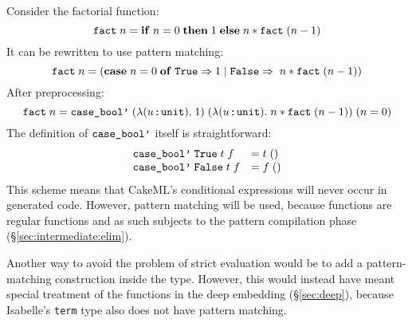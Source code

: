 Consider the factorial function:
%
  \[ \texttt{\textup{fact}}\;n = \mathtt{\mathbf{if}}\;n = 0\;\mathtt{\mathbf{then}}\;1\;\mathtt{\mathbf{else}}\;n * \texttt{\textup{fact}}\;(n - 1) \]
%
It can be rewritten to use pattern matching:
%
  \[ \texttt{\textup{fact}}\;n = (\mathtt{\mathbf{case}}\;n = 0\;\mathtt{\mathbf{of}}\;\texttt{\textup{True}} \Rightarrow 1\mid\texttt{\textup{False}} \Rightarrow \;n * \texttt{\textup{fact}}\;(n - 1)) \]
%
After preprocessing:
%
  \[ \texttt{\textup{fact}}\;n = \texttt{\textup{case\_bool'}}\;(\lambda (u \mathbin{:\!\!:} \texttt{\textup{unit}}).\;1)\;(\lambda (u \mathbin{:\!\!:} \texttt{\textup{unit}}).\;n * \texttt{\textup{fact}}\;(n - 1))\;(n = 0) \]
%
The definition of $\texttt{\textup{case\_bool'}}$ itself is straightforward:
  \[
  \begin{array}{ll}
    \texttt{\textup{case\_bool'}}\;\texttt{\textup{True}}\;t\;f &= t\;() \\
    \texttt{\textup{case\_bool'}}\;\texttt{\textup{False}}\;t\;f &= f\;()
  \end{array}
  \]
%
This scheme means that CakeML's conditional expressions will never occur in generated code.
However, pattern matching will be used, because  functions are regular functions and as such subjects to the pattern compilation phase (§\ref{sec:intermediate:elim}).

Another way to avoid the problem of strict evaluation would be to add a pattern-matching construction inside the  type.
However, this would instead have meant special treatment of the  functions in the deep embedding (§\ref{sec:deep}), because Isabelle's \texttt{term} type also does not have pattern matching.
